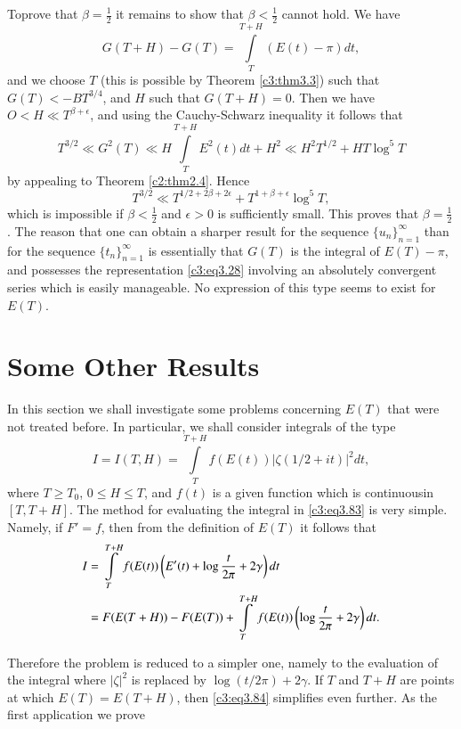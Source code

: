 To\pageoriginale prove that $\beta = \frac{1}{2}$ it remains to show
that $\beta < \frac{1}{2}$ cannot hold. We have
$$
G(T+H) - G(T)= \int\limits_{T}^{T+H} (E(t)- \pi) dt,
$$
and we choose $T$ (this is possible by Theorem \ref{c3:thm3.3}) such
that $G(T) < - B T^{3/4}$, and $H$ such that $G(T+ H)=0$. Then we have
$O< H \ll T^{\beta+ \epsilon}$, and using the Cauchy-Schwarz
inequality it follows that
$$
T^{3/2} \ll G^2 (T) \ll H \int\limits_T^{T+H} E^2 (t) dt + H^2 \ll H^2
T^{1/2} + HT \log^5 T
$$
by appealing to Theorem \ref{c2:thm2.4}. Hence
$$
T^{3/2} \ll T^{1/2 + 2 \beta + 2 \epsilon} + T^{1+ \beta + \epsilon}
\log^5 T,
$$
which is impossible if $\beta < \frac{1}{2}$ and $\epsilon > 0$ is
sufficiently small. This proves that $\beta = \frac{1}{2}$. The reason
that one can obtain a sharper result for the sequence $\{
u_n\}^\infty_{n=1}$ than for the sequence $\{ t_n\}^\infty_{n=1}$ is
essentially that $G(T)$ is the integral of $E(T)- \pi$, and possesses
the representation \eqref{c3:eq3.28} involving an absolutely
convergent series which is easily manageable. No expression of this
type seems to exist for $E(T)$.

\section{Some Other Results}\label{c3:sec3.5}

In this section we shall investigate some problems concerning $E(T)$
that were not treated before. In particular, we shall consider
integrals of the type
\begin{equation}
  I = I(T, H) = \int\limits_T^{T+H} f(E (t)) |\zeta(1/2+it)|^2
  dt,\label{c3:eq3.83} 
\end{equation}
where $T \geq T_0$, $0\leq H \leq T$, and $f(t)$ is a given function
which is continuous\pageoriginale in $[T, T+ H]$. The method for
evaluating the integral in \eqref{c3:eq3.83} is very simple. Namely,
if $F'=f$, then from the definition of $E(T)$ it follows that 
\begin{align}
  I &= \int\limits_{T}^{T+H} f(E(t)) \left(E' (t)+ \log \frac{t}{2 \pi} + 2
  \gamma\right) dt\label{c3:eq3.84}\\
  & = F(E(T+H)) - F(E(T)) + \int\limits_T^{T+H} f(E(t)) \left(\log
  \frac{t}{2 \pi} + 2 \gamma\right)dt.\notag
\end{align}

Therefore the problem is reduced to a simpler one, namely to the
evaluation of the integral where $|\zeta|^2$ is replaced by
$\log(t/2\pi) + 2 \gamma$. If $T$ and $T+H$ are points at which $E(T)=
E(T+H)$, then \eqref{c3:eq3.84} simplifies even further. As the first
application we prove

